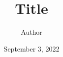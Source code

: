 \documentclass[a4paper,12pt,twoside]{article}
\author{Author}
\title{Title}
\date{September 3, 2022}
\begin{document}
\maketitle
\thispagestyle{fancy}
\lipsum[1-5] \cite{10.5555/3207796}
\printbibliography  %
\end{document}
